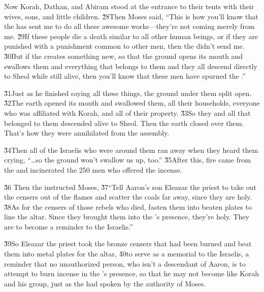 Now Korah, Dathan, and Abiram stood at the entrance to their tents with their wives, sons, and little children. \v{28}Then Moses said, ``This is how you'll know that the  has sent me to do all these awesome works---they're not coming merely from me. \v{29}If these people die a death similar to all other human beings, or if they are punished with a punishment common to other men, then the  didn't send me. \v{30}But if the  creates something new, so that the ground opens its mouth and swallows them and everything that belongs to them and they all descend directly to Sheol while still alive, then you'll know that these men have spurned the .''

\v{31}Just as he finished saying all these things, the ground under them split open. \v{32}The earth opened its mouth and swallowed them, all their households, everyone who was affiliated with Korah, and all of their property. \v{33}So they and all that belonged to them descended alive to Sheol. Then the earth closed over them. That's how they were annihilated from the assembly.

\v{34}Then all of the Israelis who were around them ran away when they heard them crying, ``{\ldots}so the ground won't swallow us up, too.'' \v{35}After this, fire came from the  and incinerated the 250 men who offered the incense.

\v{36} Then the  instructed Moses, \v{37}``Tell Aaron's son Eleazar the priest to take out the censers out of the flames and scatter the coals far away, since they are holy. \v{38}As for the censers of those rebels who died, fasten them into beaten plates to line the altar. Since they brought them into the 's presence, they're holy. They are to become a reminder to the Israelis.''

\v{39}So Eleazar the priest took the bronze censers that had been burned and beat them into metal plates for the altar, \v{40}to serve as a memorial to the Israelis, a reminder that no unauthorized person, who isn't a descendant of Aaron, is to attempt to burn incense in the 's presence, so that he may not become like Korah and his group, just as the  had spoken by the authority of Moses.

